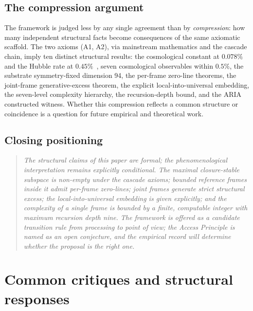 \documentclass[11pt]{article}
\theoremstyle{plain}
\theoremstyle{definition}
\theoremstyle{remark}
\begin{document}
\subsection{The compression argument}

The framework is judged less by any single agreement than by \emph{compression}: how many independent structural facts become consequences of the same axiomatic scaffold. The two axioms (A1, A2), via mainstream mathematics and the cascade chain, imply ten distinct structural results: the cosmological constant at $0.078\%$ and the Hubble rate at $0.45\%$~\citep{SmartHypersphereCosmology}, seven cosmological observables within $0.5\%$, the substrate symmetry-fixed dimension 94, the per-frame zero-line theorems, the joint-frame generative-excess theorem, the explicit local-into-universal embedding, the seven-level complexity hierarchy, the recursion-depth bound, and the ARIA constructed witness. Whether this compression reflects a common structure or coincidence is a question for future empirical and theoretical work.

\subsection{Closing positioning}

\begin{quote}
\textit{The structural claims of this paper are formal; the phenomenological interpretation remains explicitly conditional. The maximal closure-stable subspace is non-empty under the cascade axioms; bounded reference frames inside it admit per-frame zero-lines; joint frames generate strict structural excess; the local-into-universal embedding is given explicitly; and the complexity of a single frame is bounded by a finite, computable integer with maximum recursion depth nine. The framework is offered as a candidate transition rule from processing to point of view; the Access Principle is named as an open conjecture, and the empirical record will determine whether the proposal is the right one.}
\end{quote}

\section{Common critiques and structural responses}\label{sec:critiques}
\end{document}
